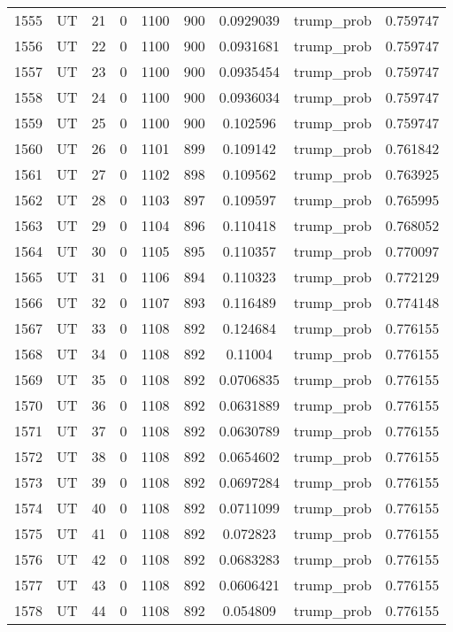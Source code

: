 \documentclass[12pt,a4paper]{article}
\begin{document}
\begin{tabular}{r|cccccccc}
	1555 & UT & 21 & 0 & 1100 & 900 & 0.0929039 & trump\_prob & 0.759747 \\
	1556 & UT & 22 & 0 & 1100 & 900 & 0.0931681 & trump\_prob & 0.759747 \\
	1557 & UT & 23 & 0 & 1100 & 900 & 0.0935454 & trump\_prob & 0.759747 \\
	1558 & UT & 24 & 0 & 1100 & 900 & 0.0936034 & trump\_prob & 0.759747 \\
	1559 & UT & 25 & 0 & 1100 & 900 & 0.102596 & trump\_prob & 0.759747 \\
	1560 & UT & 26 & 0 & 1101 & 899 & 0.109142 & trump\_prob & 0.761842 \\
	1561 & UT & 27 & 0 & 1102 & 898 & 0.109562 & trump\_prob & 0.763925 \\
	1562 & UT & 28 & 0 & 1103 & 897 & 0.109597 & trump\_prob & 0.765995 \\
	1563 & UT & 29 & 0 & 1104 & 896 & 0.110418 & trump\_prob & 0.768052 \\
	1564 & UT & 30 & 0 & 1105 & 895 & 0.110357 & trump\_prob & 0.770097 \\
	1565 & UT & 31 & 0 & 1106 & 894 & 0.110323 & trump\_prob & 0.772129 \\
	1566 & UT & 32 & 0 & 1107 & 893 & 0.116489 & trump\_prob & 0.774148 \\
	1567 & UT & 33 & 0 & 1108 & 892 & 0.124684 & trump\_prob & 0.776155 \\
	1568 & UT & 34 & 0 & 1108 & 892 & 0.11004 & trump\_prob & 0.776155 \\
	1569 & UT & 35 & 0 & 1108 & 892 & 0.0706835 & trump\_prob & 0.776155 \\
	1570 & UT & 36 & 0 & 1108 & 892 & 0.0631889 & trump\_prob & 0.776155 \\
	1571 & UT & 37 & 0 & 1108 & 892 & 0.0630789 & trump\_prob & 0.776155 \\
	1572 & UT & 38 & 0 & 1108 & 892 & 0.0654602 & trump\_prob & 0.776155 \\
	1573 & UT & 39 & 0 & 1108 & 892 & 0.0697284 & trump\_prob & 0.776155 \\
	1574 & UT & 40 & 0 & 1108 & 892 & 0.0711099 & trump\_prob & 0.776155 \\
	1575 & UT & 41 & 0 & 1108 & 892 & 0.072823 & trump\_prob & 0.776155 \\
	1576 & UT & 42 & 0 & 1108 & 892 & 0.0683283 & trump\_prob & 0.776155 \\
	1577 & UT & 43 & 0 & 1108 & 892 & 0.0606421 & trump\_prob & 0.776155 \\
	1578 & UT & 44 & 0 & 1108 & 892 & 0.054809 & trump\_prob & 0.776155 \\

\end{tabular}
\end{document}
